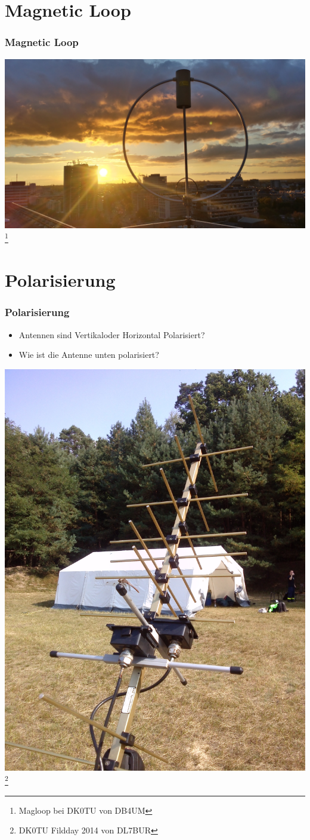 \section*{Magnetic Loop}

\begin{frame}
    \frametitle{Magnetic Loop}
    \begin{center}
        \includegraphics[width=1\textwidth]{e11/Magloop.jpg}
        \footnote{\tiny Magloop bei DK0TU von DB4UM}
	\end{center}
\end{frame}

\section*{Polarisierung}

\begin{frame}
    \frametitle{Polarisierung}
    	\begin{itemize}
		\item Antennen sind Vertikaloder Horizontal Polarisiert?
		\item Wie ist die Antenne unten polarisiert?
    \end{itemize}
    \begin{center}
        \includegraphics[width=.4\textwidth]{e11/kreutzYagi.jpg}
        \footnote{\tiny DK0TU Fildday 2014 von DL7BUR}
	\end{center}
\end{frame}

